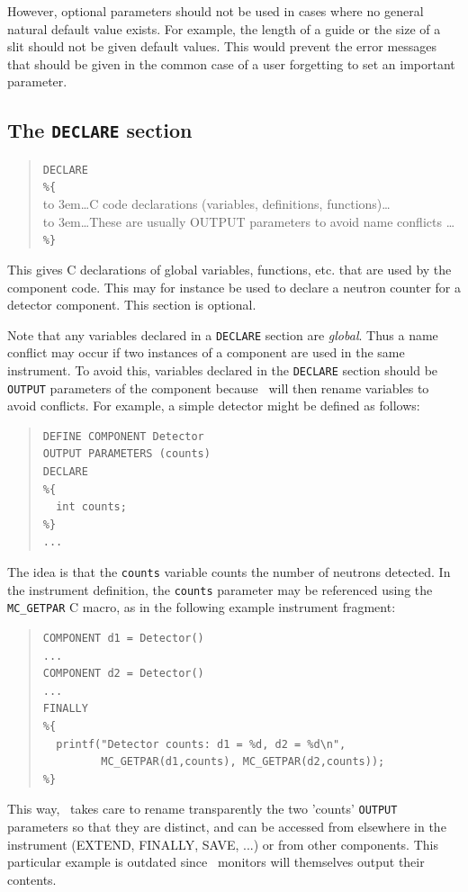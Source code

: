 However, optional parameters should not be used in cases where no
general natural default value exists. For example, the length of a guide
or the size of a slit should not be given default values. This would
prevent the error messages that should be given in the common case of a
user forgetting to set an important parameter.


\subsection{The \texttt{DECLARE} section}
\label{s:comp-declare}
\begin{quote}
  \texttt{DECLARE} \\
  \verb|%{| \\
  \hbox to 3em{}\ldots C code declarations (variables, definitions, functions)\ldots \\
  \hbox to 3em{}\ldots These are usually OUTPUT parameters to avoid name conflicts \ldots \\
  \verb|%}|
\end{quote}
This gives C declarations of global variables, functions, etc. that are used by the
component code. This may for instance be used to declare a neutron
counter for a detector component. This section is optional.

Note that any variables declared in a \verb+DECLARE+ section are
\emph{global}. Thus a name conflict may occur if two instances of a
component are used in the same instrument. To avoid this, variables
declared in the \texttt{DECLARE} section should be \texttt{OUTPUT} parameters of
the component because \MCS\ will then rename variables to avoid conflicts.
For example, a simple detector might be defined as follows:
\begin{quote}
\begin{verbatim}
DEFINE COMPONENT Detector
OUTPUT PARAMETERS (counts)
DECLARE
%{
  int counts;
%}
...
\end{verbatim}
\end{quote}
The idea is that the \texttt{counts} variable counts the number of
neutrons detected. In the instrument definition, the \texttt{counts}
parameter may be referenced using the \verb+MC_GETPAR+ C macro, as in
the following example instrument fragment:\label{mcgetpar}
\begin{quote}
\begin{verbatim}
COMPONENT d1 = Detector()
...
COMPONENT d2 = Detector()
...
FINALLY
%{
  printf("Detector counts: d1 = %d, d2 = %d\n",
         MC_GETPAR(d1,counts), MC_GETPAR(d2,counts));
%}
\end{verbatim}
\end{quote}
This way, \MCS\ takes care to rename transparently the two 'counts'
\texttt{OUTPUT} parameters so that they are distinct, and can be
accessed from elsewhere in the instrument (EXTEND, FINALLY, SAVE, ...)
or from other components. This particular example is outdated since
\MCS\ monitors will themselves output their contents.


